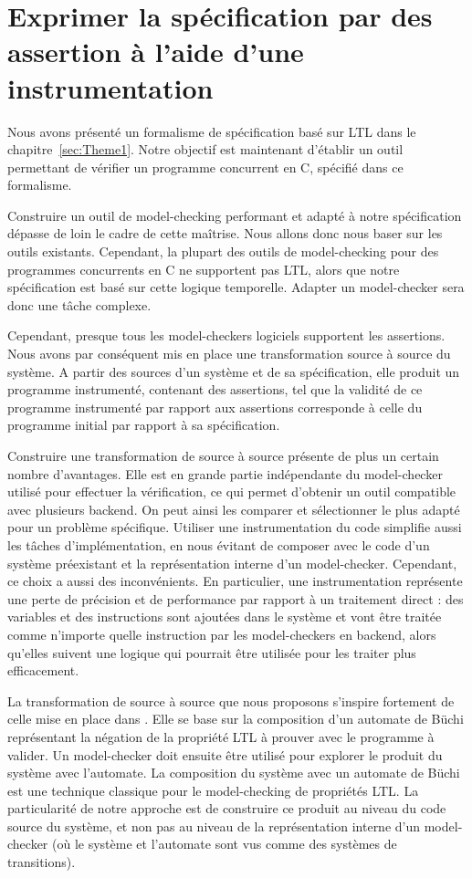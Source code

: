 \chapter{Exprimer la spécification par des assertion à l'aide d'une
instrumentation}\label{sec:Theme2}

Nous avons présenté un formalisme de spécification basé sur \ac{LTL} dans le
chapitre~\ref{sec:Theme1}. Notre objectif est maintenant d'établir un outil
permettant de vérifier un programme concurrent en C, spécifié dans ce
formalisme.

Construire un outil de model-checking performant et adapté à notre spécification
dépasse de loin le cadre de cette maîtrise. Nous allons donc nous baser sur les
outils existants. Cependant, la plupart des outils de model-checking pour des
programmes concurrents en C ne supportent pas \ac{LTL}, alors que notre
spécification est basé sur cette logique temporelle. Adapter un model-checker
sera donc une tâche complexe.

Cependant, presque tous les model-checkers logiciels supportent les assertions.
Nous avons par conséquent mis en place une transformation source à source du
système. A partir des sources d'un système et de sa spécification, elle produit
un programme instrumenté, contenant des assertions, tel que la validité de ce
programme instrumenté par rapport aux assertions corresponde à celle du
programme initial par rapport à sa spécification.

Construire une transformation de source à source présente de plus un certain
nombre d'avantages. Elle est en grande partie indépendante du model-checker
utilisé pour effectuer la vérification, ce qui permet d'obtenir un outil
compatible avec plusieurs backend. On peut ainsi les comparer et sélectionner le
plus adapté pour un problème spécifique. Utiliser une instrumentation du code
simplifie aussi les tâches d'implémentation, en nous évitant de composer avec le
code d'un système préexistant et la représentation interne d'un model-checker.
Cependant, ce choix a aussi des inconvénients. En particulier, une
instrumentation représente une perte de précision et de performance par rapport
à un traitement direct : des variables et des instructions sont ajoutées dans le
système et vont être traitée comme n'importe quelle instruction par les
model-checkers en backend, alors qu'elles suivent une logique qui pourrait être
utilisée pour les traiter plus efficacement.

La transformation de source à source que nous proposons s'inspire fortement de
celle mise en place dans \cite{morse_ltl}. Elle se base sur la composition d'un
automate de Büchi représentant la négation de la propriété \ac{LTL} à prouver
avec le programme à valider. Un model-checker doit ensuite être utilisé pour
explorer le produit du système avec l'automate. La composition du système avec
un automate de Büchi est une technique classique pour le model-checking de
propriétés LTL\cite{25_years_of_model_checking}. La particularité de notre
approche est de construire ce produit au niveau du code source du système, et
non pas au niveau de la représentation interne d'un model-checker (où le système
et l'automate sont vus comme des systèmes de transitions).

